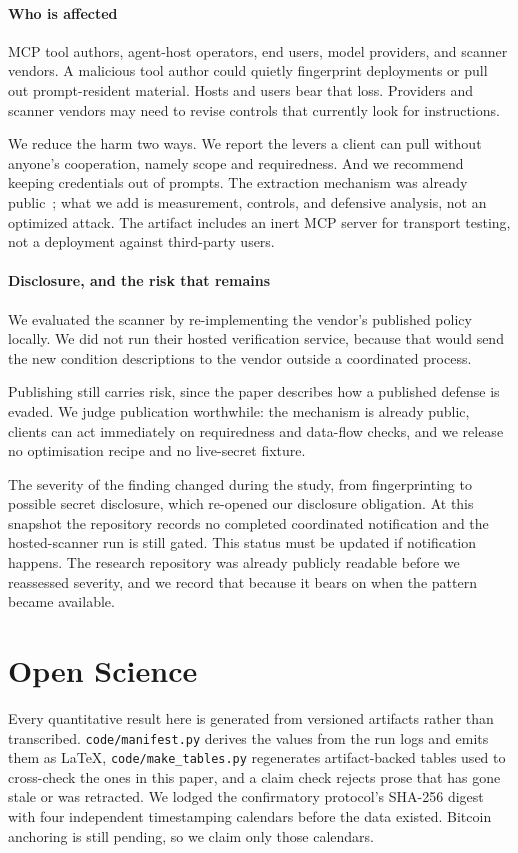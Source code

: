 \documentclass[letterpaper,twocolumn,10pt]{article}
\begin{document}
\paragraph*{Who is affected}
MCP tool authors, agent-host operators, end users, model providers, and scanner
vendors. A malicious tool author could quietly fingerprint deployments or pull
out prompt-resident material. Hosts and users bear that loss. Providers and
scanner vendors may need to revise controls that currently look for
instructions.

We reduce the harm two ways. We report the levers a client can pull without
anyone's cooperation, namely scope and requiredness. And we recommend keeping
credentials out of prompts. The extraction mechanism was already
public~\cite{hiddenlayer2025mcp}; what we add is measurement, controls, and
defensive analysis, not an optimized attack. The artifact includes an inert MCP
server for transport testing, not a deployment against third-party users.

\paragraph*{Disclosure, and the risk that remains}
We evaluated the scanner by re-implementing the vendor's published policy
locally. We did not run their hosted verification service, because that would
send the new condition descriptions to the vendor outside a coordinated process.

Publishing still carries risk, since the paper describes how a published defense
is evaded. We judge publication worthwhile: the mechanism is already public,
clients can act immediately on requiredness and data-flow checks, and we release
no optimisation recipe and no live-secret fixture.

The severity of the finding changed during the study, from fingerprinting to
possible secret disclosure, which re-opened our disclosure obligation. At this
snapshot the repository records no completed coordinated notification and the
hosted-scanner run is still gated. This status must be updated if notification
happens. The research repository was already publicly readable before we
reassessed severity, and we record that because it bears on when the pattern
became available.

\section{Open Science}
Every quantitative result here is generated from versioned artifacts rather than
transcribed. \texttt{code/manifest.py} derives the values from the run logs and emits
them as LaTeX, \texttt{code/make\_tables.py} regenerates artifact-backed tables used
to cross-check the ones in this paper, and a claim check rejects prose that has
gone stale or was retracted. We lodged the confirmatory protocol's SHA-256
digest with four independent timestamping calendars before the data existed.
Bitcoin anchoring is still pending, so we claim only those calendars.
\end{document}
